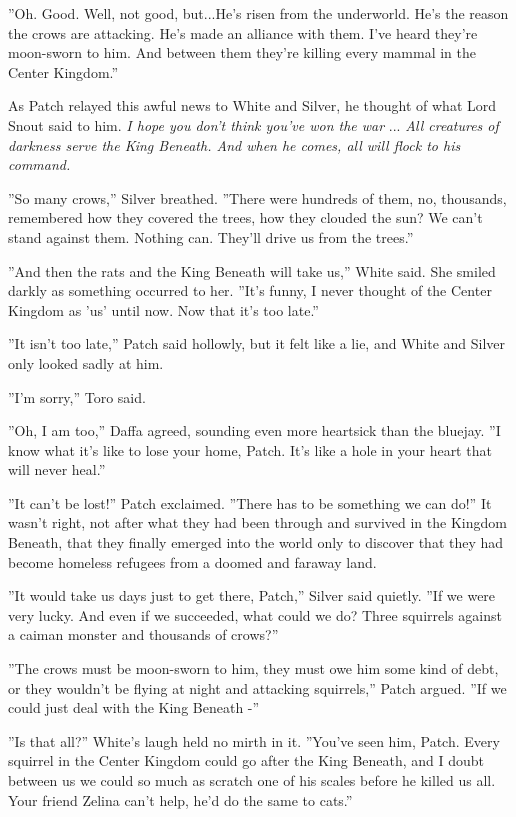 \documentclass[12pt]{book}
\begin{document}
''Oh. Good. Well, not good, but...He's risen from the underworld. He's the reason the crows are attacking. He's made an alliance with them. I've heard they're moon-sworn to him. And between them they're killing every mammal in the Center Kingdom.''

As Patch relayed this awful news to White and Silver, he thought of what Lord Snout said to him. {\it I hope you don't think you've won the war} ... {\it All creatures of darkness serve the King Beneath. And when he comes, all will flock to his command.}

''So many crows,'' Silver breathed. ''There were hundreds of them, no, thousands, remembered how they covered the trees, how they clouded the sun? We can't stand against them. Nothing can. They'll drive us from the trees.''

''And then the rats and the King Beneath will take us,'' White said. She smiled darkly as something occurred to her. ''It's funny, I never thought of the Center Kingdom as 'us' until now. Now that it's too late.''

''It isn't too late,'' Patch said hollowly, but it felt like a lie, and White and Silver only looked sadly at him.

''I'm sorry,'' Toro said.

''Oh, I am too,'' Daffa agreed, sounding even more heartsick than the bluejay. ''I know what it's like to lose your home, Patch. It's like a hole in your heart that will never heal.''

''It can't be lost!'' Patch exclaimed. ''There has to be something we can do!'' It wasn't right, not after what they had been through and survived in the Kingdom Beneath, that they finally emerged into the world only to discover that they had become homeless refugees from a doomed and faraway land.

''It would take us days just to get there, Patch,'' Silver said quietly. ''If we were very lucky. And even if we succeeded, what could we do? Three squirrels against a caiman monster and thousands of crows?'' 

''The crows must be moon-sworn to him, they must owe him some kind of debt, or they wouldn't be flying at night and attacking squirrels,'' Patch argued. ''If we could just deal with the King Beneath -''

''Is that all?'' White's laugh held no mirth in it. ''You've seen him, Patch. Every squirrel in the Center Kingdom could go after the King Beneath, and I doubt between us we could so much as scratch one of his scales before he killed us all. Your friend Zelina can't help, he'd do the same to cats.''
\end{document}
